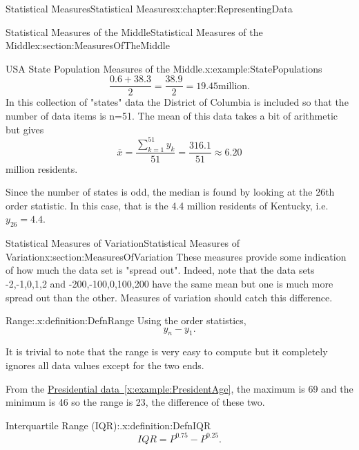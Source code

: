 \documentclass[oneside,10pt,]{book}
\newcommand{\xreffont}{\relax}
\numberwithin{equation}{section}
\begin{document}
\begin{chapterptx}{Statistical Measures}{}{Statistical Measures}{}{}{x:chapter:RepresentingData}
\begin{sectionptx}{Statistical Measures of the Middle}{}{Statistical Measures of the Middle}{}{}{x:section:MeasuresOfTheMiddle}
\begin{example}{USA State Population Measures of the Middle.}{x:example:StatePopulations}
\begin{equation*}
\frac{0.6+38.3}{2} = \frac{38.9}{2} = 19.45  \text{million}.
\end{equation*}
In this collection of "states" data the District of Columbia is included so that the number of data items is n=51. The mean of this data takes a bit of arithmetic but gives%
\begin{equation*}
\overline{x} = \frac{\sum_{k=1}^{51} y_k }{51} = \frac{316.1}{51} \approx 6.20
\end{equation*}
million residents.%
\par
Since the number of states is odd, the median is found by looking at the 26th order statistic. In this case, that is the 4.4 million residents of Kentucky, i.e. \(y_{26} = 4.4\).%
\end{example}
%
\end{sectionptx}
%
%
\typeout{************************************************}
\typeout{************************************************}
%
\begin{sectionptx}{Statistical Measures of Variation}{}{Statistical Measures of Variation}{}{}{x:section:MeasuresOfVariation}
These measures provide some indication of how much the data set is "spread out". Indeed, note that the data sets \textbraceleft{}-2,-1,0,1,2\textbraceright{} and \textbraceleft{}-200,-100,0,100,200\textbraceright{} have the same mean but one is much more spread out than the other. Measures of variation should catch this difference.%
\par
\begin{definition}{Range:.}{x:definition:DefnRange}%
Using the order statistics,%
\begin{equation*}
y_n - y_1.
\end{equation*}
%
\end{definition}
%
\par
It is trivial to note that the range is very easy to compute but it completely ignores all data values except for the two ends.%
\par
From the \hyperref[x:example:PresidentAge]{Presidential data~{\xreffont\ref{x:example:PresidentAge}}}, the maximum is 69 and the minimum is 46 so the range is 23, the difference of these two.%
\par
\begin{definition}{Interquartile Range (IQR):.}{x:definition:DefnIQR}%
%
\begin{equation*}
IQR = P^{0.75} - P^{0.25}.
\end{equation*}

\end{definition}
\end{sectionptx}
\end{chapterptx}
\end{document}
